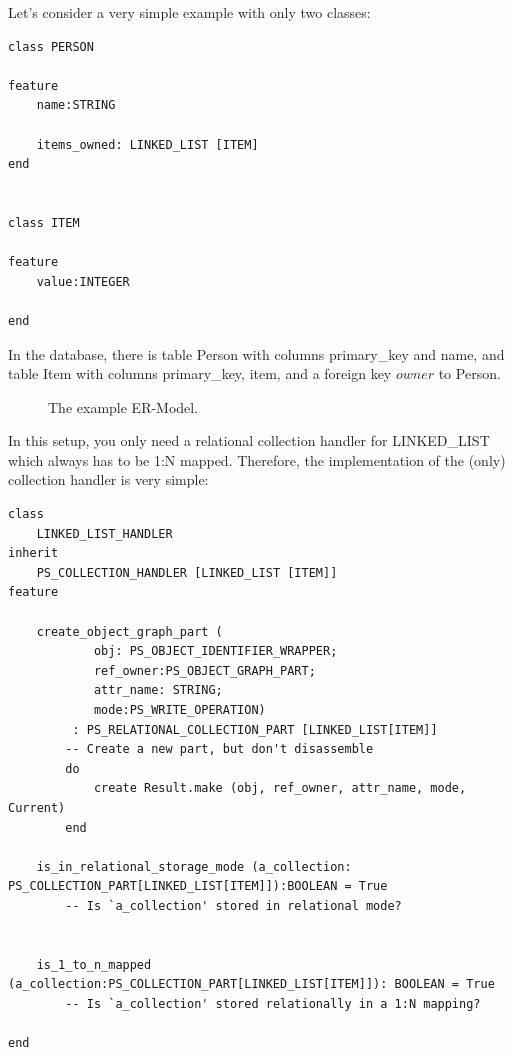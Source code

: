 Let's consider a very simple example with only two classes:

\begin{lstlisting}[language=OOSC2Eiffel, captionpos=b, caption={Example classes}, label={lst:example_application}]
class PERSON

feature
	name:STRING

	items_owned: LINKED_LIST [ITEM]
end


class ITEM

feature
	value:INTEGER

end
\end{lstlisting}

In the database, there is table Person with columns primary\_key and name, and table Item with columns primary\_key, item, and a foreign key $owner$ to Person.


\begin{figure} [h!]
\centering
{}
\caption{The example ER-Model.}
\label{fig:er_model_example}
\end{figure}

In this setup, you only need a relational collection handler for LINKED\_LIST which always has to be 1:N mapped.
Therefore, the implementation of the (only) collection handler is very simple:

\begin{lstlisting}[language=OOSC2Eiffel, captionpos=b, caption={The collection handler for LINKED\_LIST}, label={lst:my_linked_list_collection_handler}]
class 
	LINKED_LIST_HANDLER
inherit
	PS_COLLECTION_HANDLER [LINKED_LIST [ITEM]]
feature

	create_object_graph_part (
			obj: PS_OBJECT_IDENTIFIER_WRAPPER;
			ref_owner:PS_OBJECT_GRAPH_PART; 
			attr_name: STRING;
			mode:PS_WRITE_OPERATION)
		 : PS_RELATIONAL_COLLECTION_PART [LINKED_LIST[ITEM]]
		-- Create a new part, but don't disassemble
		do
			create Result.make (obj, ref_owner, attr_name, mode, Current)
		end

	is_in_relational_storage_mode (a_collection: PS_COLLECTION_PART[LINKED_LIST[ITEM]]):BOOLEAN = True
		-- Is `a_collection' stored in relational mode?


	is_1_to_n_mapped (a_collection:PS_COLLECTION_PART[LINKED_LIST[ITEM]]): BOOLEAN = True
		-- Is `a_collection' stored relationally in a 1:N mapping?

end
\end{lstlisting}


